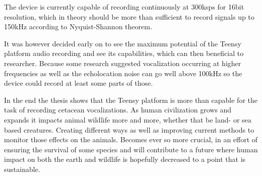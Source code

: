 The device is currently capable of recording continuously at 300ksps for 16bit resolution, which in theory should be more than sufficient to record signals up to 150kHz according to Nyquist-Shannon theorem.

It was however decided early on to see the maximum potential of the Teensy platform audio recording and see its capabilities, which can then beneficial to researcher.
Because some research suggested vocalization occurring at higher frequencies as well as the echolocation noise can go well above 100kHz so the device could record at least some parts of those.

In the end the thesis shows that the Teensy platform is more than capable for the task of recording cetacean vocalizations.
As human civilization grows and expands it impacts animal wildlife more and more, whether that be land- or sea based creatures.
Creating different ways as well as improving current methods to monitor those effects on the animals.
Becomes ever so more crucial, in an effort of ensuring the survival of some species and will contribute to a future where human impact on both the earth and wildlife is hopefully decreased to a point that is sustainable.

